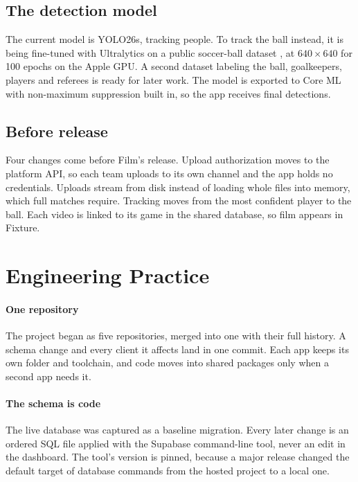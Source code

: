 \documentclass[letterpaper,11pt]{article}
\begin{document}
\subsection{The detection model}

The current model is YOLO26s, tracking people. To track the ball instead, it is being fine-tuned
with Ultralytics on a public soccer-ball dataset \citep{RoboflowBall}, at $640 \times 640$ for 100
epochs on the Apple GPU. A second dataset labeling the ball, goalkeepers, players and referees
\citep{RoboflowPlayers} is ready for later work. The model is exported to Core ML with
non-maximum suppression built in, so the app receives final detections.

\subsection{Before release}

Four changes come before Film's release. Upload authorization moves to the platform API, so each
team uploads to its own channel and the app holds no credentials. Uploads stream from disk instead
of loading whole files into memory, which full matches require. Tracking moves from the most
confident player to the ball. Each video is linked to its game in the shared database, so film
appears in Fixture.

\section{Engineering Practice}\label{s:practice}

\paragraph{One repository} The project began as five repositories, merged into one with their
full history. A schema change and every client it affects land in one commit. Each app keeps its
own folder and toolchain, and code moves into shared packages only when a second app needs it.

\paragraph{The schema is code} The live database was captured as a baseline migration. Every later
change is an ordered SQL file applied with the Supabase command-line tool, never an edit in the
dashboard. The tool's version is pinned, because a major release changed the default target of
database commands from the hosted project to a local one.
\end{document}
